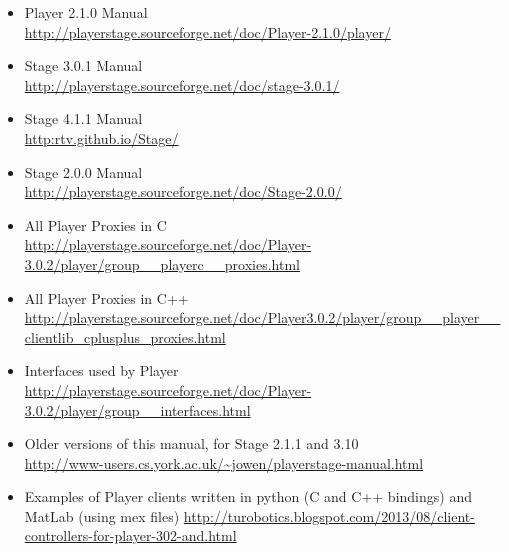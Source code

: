 \documentclass[a4paper]{report}
\begin{document}
\begin{itemize}

\item Player 2.1.0 Manual \\
\url{http://playerstage.sourceforge.net/doc/Player-2.1.0/player/}

\item Stage 3.0.1 Manual \\
\url{http://playerstage.sourceforge.net/doc/stage-3.0.1/}

\item Stage 4.1.1 Manual \\
\url{http:rtv.github.io/Stage/}

\item Stage 2.0.0 Manual\\
\url{http://playerstage.sourceforge.net/doc/Stage-2.0.0/}

\item All Player Proxies in C\\
\url{http://playerstage.sourceforge.net/doc/Player-3.0.2/player/group__playerc__proxies.html}

\item All Player Proxies in C++\\
\url{http://playerstage.sourceforge.net/doc/Player3.0.2/player/group__player__clientlib_cplusplus_proxies.html}

\item Interfaces used by Player\\
\url{http://playerstage.sourceforge.net/doc/Player-3.0.2/player/group__interfaces.html}

\item Older versions of this manual, for Stage 2.1.1 and 3.10\\
\url{http://www-users.cs.york.ac.uk/~jowen/playerstage-manual.html}

\item Examples of Player clients written in python (C and C++ bindings) and
      MatLab (using mex files)
\url{http://turobotics.blogspot.com/2013/08/client-controllers-for-player-302-and.html}

\end{itemize}


 
\nocite{*}



\end{document}
